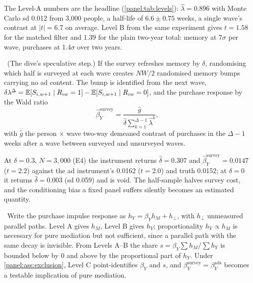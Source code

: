 The Level-A numbers are the headline (\cref{panel:tab:levels}): $\hat\lambda = 0.896$ with Monte Carlo sd 0.012 from 3,000 people, a half-life of $6.6 \pm 0.75$ weeks, a single wave's contrast at $|t| = 6.7$ on average. Level B from the same experiment gives $t = 1.58$ for the matched filter and $1.39$ for the plain two-year total: memory at 7$\sigma$ per wave, purchases at 1.4$\sigma$ over two years.

\begin{construction}
\label{panel:con:survey}
\tagConjecture\ (The dive's speculative step.) If the survey refreshes memory by $\delta$, randomising which half is surveyed at each wave creates $NW/2$ randomised memory bumps carrying no ad content. The bump is identified from the next wave, $\delta\lambda^{\Delta} = \mathbb{E}[S_{i,w+1} \mid R_{iw} = 1] - \mathbb{E}[S_{i,w+1} \mid R_{iw} = 0]$, and the purchase response by the Wald ratio
\begin{equation}
\hat\beta_Y^{\mathrm{survey}} = \frac{\hat g}{\hat\delta \sum_{k=1}^{\Delta - 1} \hat\lambda^{k}},
\label{panel:eq:wald}
\end{equation}
with $\hat g$ the person $\times$ wave two-way demeaned contrast of purchases in the $\Delta - 1$ weeks after a wave between surveyed and unsurveyed waves.
\end{construction}

At $\delta = 0.3$, $N = 3{,}000$ (E4) the instrument returns $\hat\delta = 0.307$ and $\hat\beta_Y^{\mathrm{survey}} = 0.0147$ ($t = 2.2$) against the ad instrument's 0.0162 ($t = 2.0$) and truth 0.0152; at $\delta = 0$ it returns $\hat\delta = 0.003$ (sd 0.059) and is void. The half-sample halves survey cost, and the conditioning bias a fixed panel suffers silently becomes an estimated quantity.

\begin{proposition}
\label{panel:prop:levelD}
\tagEstablished\ Write the purchase impulse response as $h_Y = \beta_Y h_M + h_\perp$, with $h_\perp$ unmeasured parallel paths. Level A gives $h_M$, Level B gives $h_Y$; proportionality $h_Y \propto h_M$ is necessary for pure mediation but not sufficient, since a parallel path with the same decay is invisible. From Levels A--B the share $s = \beta_Y \sum h_M / \sum h_Y$ is bounded below by 0 and above by the proportional part of $h_Y$. Under \cref{panel:ass:exclusion}, Level C point-identifies $\beta_Y$ and $s$, and $\beta_Y^{\mathrm{survey}} = \beta_Y^{\mathrm{ads}}$ becomes a testable implication of pure mediation.
\end{proposition}

